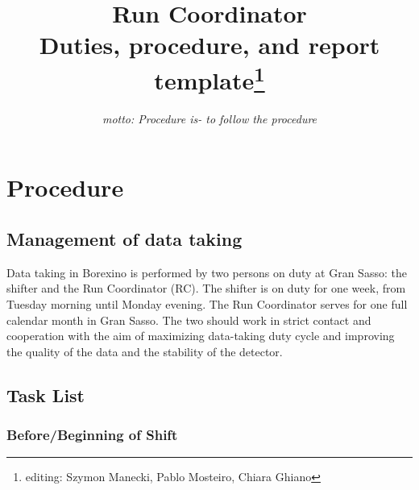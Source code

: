 \documentclass[a4paper,10pt]{article}
\begin{document}
\title{\textbf{Run Coordinator} \\
{\large \textbf{Duties, procedure, and report template}\footnote{editing: Szymon Manecki, Pablo Mosteiro, Chiara Ghiano}}}

\author{\small{\textit{motto: Procedure is- to follow the procedure}}}
\maketitle
{}

\newpage

\section{Procedure}
\label{sec:procedure}

\subsection{Management of data taking}

Data taking in Borexino is performed by two persons on duty at Gran Sasso: the shifter and the Run Coordinator (RC). The shifter is on duty for one week, from Tuesday morning until Monday evening. The Run Coordinator serves for one full calendar month in Gran Sasso. The two should work in strict contact and cooperation with the aim of maximizing data-taking duty cycle and improving the quality of the data and the stability of the detector.

\subsection{Task List}

\subsubsection{Before/Beginning of Shift}
\end{document}
